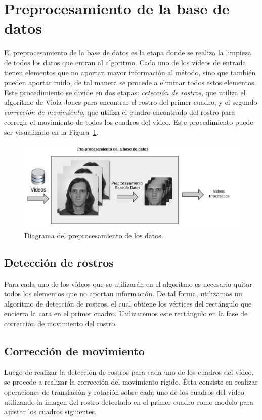 \section{Preprocesamiento de la base de datos}
\label{sec:proc_bdd}
	El preprocesamiento de la base de datos es la etapa donde se realiza la limpieza de todos los datos que entran al algoritmo. Cada uno de los vídeos de entrada tienen elementos que no aportan mayor información al método, sino que también pueden aportar ruido, de tal manera se procede a eliminar todos estos elementos. Este procedimiento se divide en dos etapas: \emph{cetección de rostros}, que utiliza el algoritmo de Viola-Jones para encontrar el rostro del primer cuadro, y el segundo \emph{corrección de movimiento}, que utiliza el cuadro encontrado del rostro para corregir el movimiento de todos los cuadros del vídeo. Este procedimiento puede ser visualizado en la Figura~\ref{algoritmo:fig:preprocesamiento}. 
	
	\begin{figure}[tb]
		\centering
    		\includegraphics[width=1\textwidth]{Figuras/Diagramas/Preprocesamiento.png}
  		\caption{Diagrama del preprocesamiento de los datos.}
  		\label{algoritmo:fig:preprocesamiento}
	\end{figure}	

	
	\subsection{Detección de rostros}
	\label{algoritmo:det_rostro}
	Para cada uno de los vídeos que se utilizarán en el algoritmo es necesario quitar todos los elementos que no aportan información. De tal forma, utilizamos un algoritmo de detección de rostros, el cual obtiene los vértices del rectángulo que encierra la cara en el primer cuadro. Utilizaremos este rectángulo en la fase de corrección de movimiento del rostro. 
		
	\subsection{Corrección de movimiento}
	\label{algoritmo:cor_movimiento}
	Luego de realizar la detección de rostros para cada uno de los cuadros del vídeo, se procede a realizar la corrección del movimiento rígido. Ésta consiste en realizar operaciones de translación y rotación sobre cada uno de los cuadros del vídeo utilizando la imagen del rostro detectado en el primer cuadro como modelo para ajustar los cuadros siguientes.


